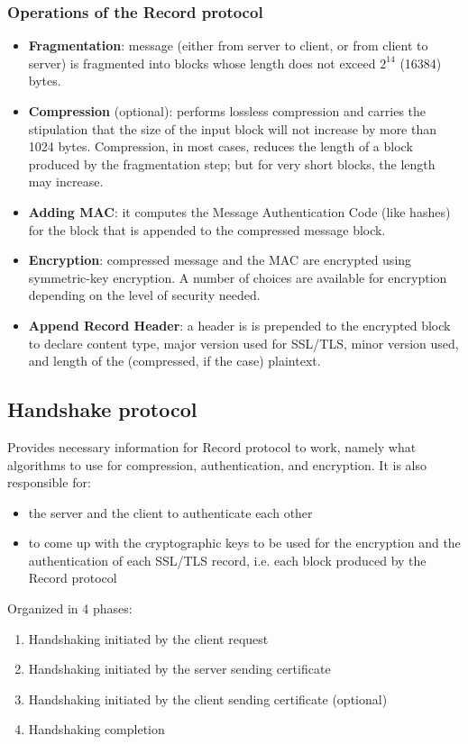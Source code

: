 \documentclass[a4paper, 10pt, titlepage]{article}
\begin{document}
\subsubsection{Operations of the Record protocol}
\begin{itemize}
\item \textbf{Fragmentation}: message (either from server to client, or from client to server) is fragmented into blocks whose length does not exceed $2^{14}$ (16384) bytes.
\item \textbf{Compression} (optional): performs lossless compression and carries the stipulation that the size of the input block will not increase by more than 1024 bytes. Compression, in most cases, reduces the length of a block produced by the fragmentation step; but for very short blocks, the length may increase.
\item \textbf{Adding MAC}: it computes the Message Authentication Code (like hashes) for the block that is appended to the compressed message block.
\item \textbf{Encryption}: compressed message and the MAC are encrypted using symmetric-key encryption. A number of choices are available for encryption depending on the level of security needed.
\item \textbf{Append Record Header}: a header is is prepended to the encrypted block to declare content type, major version used for SSL/TLS, minor version used, and length of the (compressed, if the case) plaintext.	%
\end{itemize}

\subsection{Handshake protocol}
Provides necessary information for Record protocol to work, namely what algorithms to use for compression, authentication, and encryption. It is also responsible for:
\begin{itemize}
\item the server and the client to authenticate each other
\item to come up with the cryptographic keys to be used for the encryption and the authentication of each SSL/TLS record, i.e. each block produced by the Record protocol
\end{itemize}
Organized in 4 phases:
\begin{enumerate}
\item Handshaking initiated by the client request
\item Handshaking initiated by the server sending certificate
\item Handshaking initiated by the client sending certificate (optional)
\item Handshaking completion
\end{enumerate}
\end{document}
